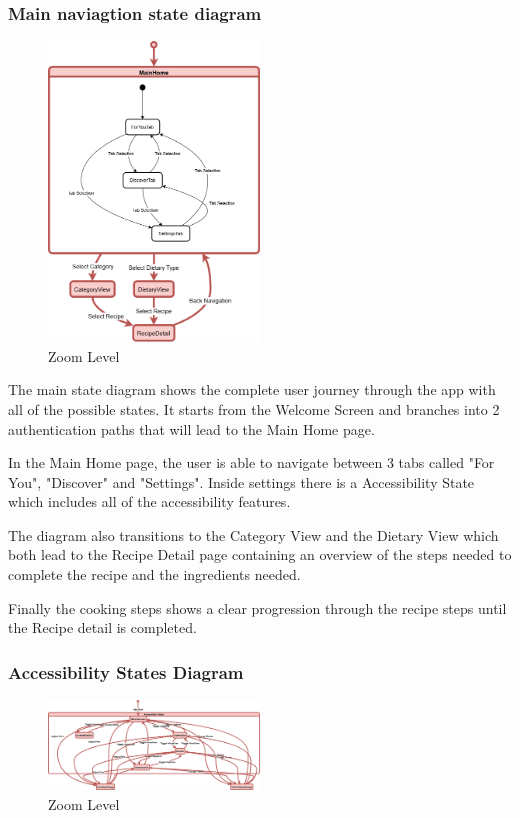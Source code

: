 \documentclass[]{project_final}
\begin{document}
\newpage
\subsubsection{Main naviagtion state diagram}

\begin{figure}[ht!]
    \centering
    \includegraphics[width=0.5\textwidth]{MainNavigationStateMRA.png}
    \vspace*{0.0cm}
    \caption{Zoom Level}
    \label{fig:1}
\end{figure}

The main state diagram shows the complete user journey through the app with all of the possible states. It starts from the Welcome Screen and branches into 2 authentication paths that will lead to the Main Home page.

In the Main Home page, the user is able to navigate between 3 tabs called "For You", "Discover" and "Settings". Inside settings there is a Accessibility State which includes all of the accessibility features.

The diagram also transitions to the Category View and the Dietary View which both lead to the Recipe Detail page containing an overview of the steps needed to complete the recipe and the ingredients needed.

Finally the cooking steps shows a clear progression through the recipe steps until the Recipe detail is completed.


\newpage

\subsubsection{Accessibility States Diagram}
\begin{figure}[ht!]
    \centering
    \includegraphics[width=0.5\textwidth]{accessibilityStatesMRA.png}
    \vspace*{0.0cm}
    \caption{Zoom Level}
    \label{fig:1}
\end{figure}
\end{document}
